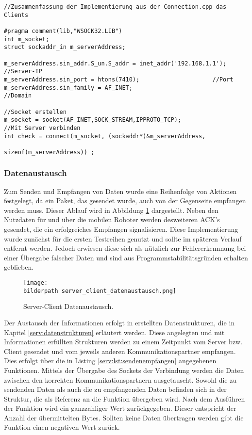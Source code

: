 \begin{lstlisting}[frame=tb,captionpos=b,caption=Socket Connection - Client., label=serv:lst:clientconn]
//Zusammenfassung der Implementierung aus der Connection.cpp das Clients

#pragma comment(lib,"WSOCK32.LIB")
int m_socket;
struct sockaddr_in m_serverAddress;

m_serverAddress.sin_addr.S_un.S_addr = inet_addr('192.168.1.1');	//Server-IP
m_serverAddress.sin_port = htons(7410);						//Port
m_serverAddress.sin_family = AF_INET;							//Domain	

//Socket erstellen
m_socket = socket(AF_INET,SOCK_STREAM,IPPROTO_TCP);
//Mit Server verbinden
int check = connect(m_socket, (sockaddr*)&m_serverAddress,
													sizeof(m_serverAddress)) ;
\end{lstlisting}

\subsubsection{Datenaustausch}
Zum Senden und Empfangen von Daten wurde eine Reihenfolge von Aktionen festgelegt, da ein Paket, das gesendet wurde, auch von der Gegenseite empfangen werden muss. Dieser Ablauf wird in Abbildung \ref{serv:fig:datenaustausch} dargestellt. Neben den Nutzdaten für und über die mobilen Roboter werden desweiteren ACK's gesendet, die ein erfolgreiches Empfangen signalisieren. Diese Implementierung wurde zunächst für die ersten Testreihen genutzt und sollte im späteren Verlauf entfernt werden. Jedoch erwiesen diese sich als nützlich zur Fehlererkennnung bei einer Übergabe falscher Daten und sind aus Programmstabilitätsgründen erhalten geblieben.

\newpage
\begin{figure}[h]
	\centering	
	\texttt{[image: \\bilderpath server\_client\_datenaustausch.png]}
	\caption{Server-Client Datenaustausch.}
	\label{serv:fig:datenaustausch}
\end{figure}

Der Austausch der Informationen erfolgt in erstellten Datenstrukturen, die in Kapitel \ref{serv:datenstrukturen} erläutert werden. Diese angelegten und mit Informationen erfüllten Strukturen werden zu einem Zeitpunkt vom Server bzw. Client gesendet und vom jeweils anderen Kommunikationspartner empfangen. Dies erfolgt über die in Listing \ref{serv:lst:sendenempfangen} angegebenen Funktionen. Mittels der Übergabe des Sockets der Verbindung werden die Daten zwischen den korrekten Kommunikationspartnern ausgetauscht. Sowohl die zu sendenden Daten als auch die zu empfangenden Daten befinden sich in der Struktur, die als Referenz an die Funktion übergeben wird. Nach dem Ausführen der Funktion wird ein ganzzahliger Wert zurückgegeben. Dieser entspricht der Anzahl der übermittelten Bytes. Sollten keine Daten übertragen werden gibt die Funktion einen negativen Wert zurück.

